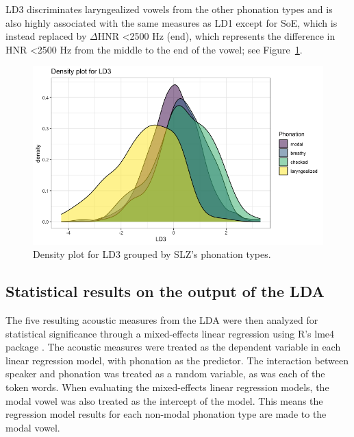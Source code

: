 \documentclass[12pt, letterpaper]{article}
\begin{document}
LD3 discriminates laryngealized vowels from the other phonation types and is also highly associated with the same measures as LD1 except for SoE, which is instead replaced by $\Delta$HNR \textless 2500 Hz (end), which represents the difference in HNR \textless 2500 Hz from the middle to the end of the vowel; see Figure~\ref*{fig:LD3}. 
\begin{figure}[!h]
    \centering
    \includegraphics[width=.75\linewidth]{Images/ld3_density.png}
    \caption{Density plot for LD3 grouped by SLZ's phonation types.}
    \label{fig:LD3}
\end{figure}


\subsection{Statistical results on the output of the LDA} \label{sec:Stats}

The five resulting acoustic measures from the LDA were then analyzed for statistical significance through a mixed-effects linear regression using R's lme4 package \citep{batesFittingLinearMixedEffects2015}. The acoustic measures were treated as the dependent variable in each linear regression model, with phonation as the predictor. The interaction between speaker and phonation was treated as a random variable, as was each of the token words. When evaluating the mixed-effects linear regression models, the modal vowel was also treated as the intercept of the model. This means the regression model results for each non-modal phonation type are made to the modal vowel.  
\end{document}
